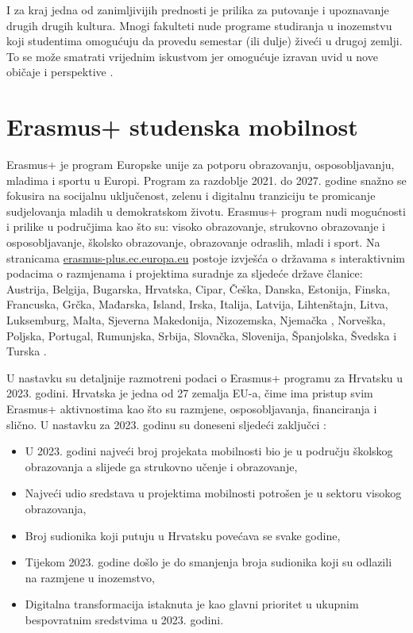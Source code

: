 \documentclass[]{foi}
\begin{document}
I za kraj jedna od zanimljivijih prednosti je prilika za putovanje i upoznavanje drugih drugih kultura. Mnogi fakulteti nude programe studiranja u inozemstvu koji studentima omogućuju da provedu 
semestar (ili dulje) živeći u drugoj zemlji. To se može smatrati vrijednim iskustvom jer omogućuje izravan uvid u nove običaje i perspektive \cite{bisio2025college}.


\section{Erasmus+ studenska mobilnost}

Erasmus+ je program Europske unije za potporu obrazovanju, osposobljavanju, mladima i sportu u Europi. Program za razdoblje 2021. do 2027. godine snažno se fokusira na socijalnu uključenost,
zelenu i digitalnu tranziciju te promicanje sudjelovanja mladih u demokratskom životu. Erasmus+ program nudi mogućnosti i prilike u područjima kao što su: visoko obrazovanje, strukovno obrazovanje i osposobljavanje,
školsko obrazovanje, obrazovanje odraslih, mladi i sport. 
Na stranicama \underline{erasmus-plus.ec.europa.eu} postoje izvješća o državama s interaktivnim podacima o razmjenama i projektima suradnje za sljedeće države članice:
Austrija, Belgija, Bugarska, Hrvatska, Cipar, Češka, Danska, Estonija, Finska, Francuska, Grčka, Mađarska, Island, Irska, Italija, Latvija, Lihtenštajn, Litva, 
Luksemburg, Malta, Sjeverna Makedonija, Nizozemska, Njemačka , Norveška, Poljska, Portugal, Rumunjska, Srbija, Slovačka, Slovenija, Španjolska, Švedska i Turska \cite{erasmus2025}.

U nastavku su detaljnije razmotreni podaci o Erasmus+ programu za Hrvatsku u 2023. godini. Hrvatska je jedna od 27 zemalja EU-a, čime ima pristup svim Erasmus+ 
aktivnostima kao što su razmjene, osposobljavanja, financiranja i slično. U nastavku za 2023. godinu su doneseni sljedeći zaključci \cite{erasmus2023croatia}:
\begin{itemize}
    \item U 2023. godini najveći broj projekata mobilnosti bio je u području školskog obrazovanja a slijede ga strukovno učenje i obrazovanje,
    \item Najveći udio sredstava u projektima mobilnosti potrošen je u sektoru visokog obrazovanja,
    \item Broj sudionika koji putuju u Hrvatsku povećava se svake godine,
    \item Tijekom 2023. godine došlo je do smanjenja broja sudionika koji su odlazili na razmjene u inozemstvo,
    \item Digitalna transformacija istaknuta je kao glavni prioritet u ukupnim bespovratnim sredstvima u 2023. godini. 
\end{itemize}
\end{document}
